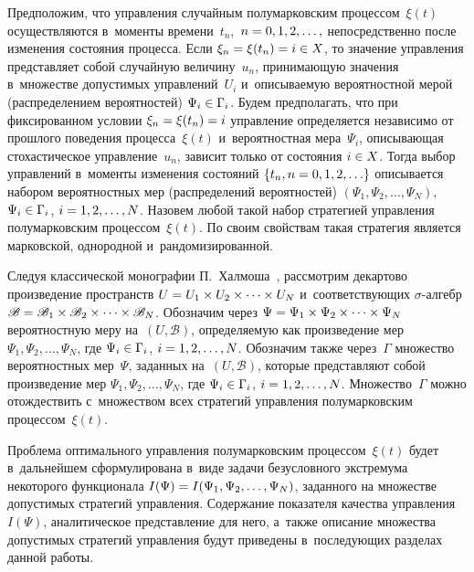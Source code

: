 \begin{multicols}{2}
Предположим, что управления случайным полумарковским процессом~$\xi(t)$ 
осуществляются в~моменты времени~$t_n,$ $n\hm=0,1,2,\ldots,$
непосредственно после изменения состояния процесса. Если\linebreak 
$\xi_n\hm=\xi(t_n)\hm=i \hm\in X$, то значение управления представляет 
собой случайную величину~$u_n$, принимающую значения в~множестве допустимых 
управ\-ле\-ний~$U_i$ и~описываемую вероятностной мерой (распределе\-ни\-ем 
вероятностей) $\Psi_i \hm\in \Gamma_i$.
Будем предполагать, что при фиксированном условии $\xi_n\hm=\xi(t_n)=i$ 
управ\-ле\-ние определяется независимо от прошлого поведения процесса~$\xi(t)$ 
и~вероятностная мера~$\Psi_i$,
описывающая стохастическое управление~$u_n$, зависит только от состояния $i\hm\in X$.
Тогда выбор управ\-ле\-ний в~моменты изменения состояний $\{t_n, n\hm=0,1,2,\ldots \}$ 
описывается набором вероятностных мер (распределений вероятностей) 
$(\Psi_1, \Psi_2,\ldots, \Psi_N)$, 
$\Psi_i \hm\in \Gamma_i$, $i\hm=1,2,\ldots,N$.
Назовем любой такой набор стратегией управ\-ле\-ния полумарковским процессом~$\xi(t)$. 
По своим свойствам такая стратегия является марковской, однородной 
и~рандомизированной.

Следуя классической монографии П.~Халмоша~\cite[гл.~VII]{18}, 
рассмотрим декартово произведение пространств $U\hm=U_1\times U_2\times \cdots\times U_N$ 
и~соответствующих $\sigma$-ал\-гебр $\mathscr{B}\hm=\mathscr{B}_1\times \mathscr{B}_2
\times \cdots \times\mathscr{B}_N$. Обозначим через $\Psi\hm=\Psi_1\times \Psi_2\times \cdots
\times \Psi_N$ вероятностную меру на~$(U,\mathscr{B})$, определяемую как 
произведение мер $\Psi_1,\Psi_2, \ldots , \Psi_N$, где $\Psi_i \hm\in \Gamma_i$, 
$i\hm=1,2,\ldots,N$. Обозначим также через~$\Gamma$ множество вероятностных мер~$\Psi$, 
заданных на~$(U,\mathscr{B})$, которые пред\-став\-ля\-ют собой произведение 
мер $\Psi_1,\Psi_2, \ldots , \Psi_N$, где $\Psi_i \hm\in \Gamma_i$, $i\hm=1,2,\ldots,N$.
Множество~$\Gamma$ можно отож\-де\-ст\-вить с~множеством всех стратегий управ\-ле\-ния 
полумарковским процессом~$\xi(t)$.

Проблема оптимального управления полумар\-ковским процессом~$\xi(t)$ будет в~дальнейшем 
сформулирована в~виде задачи безусловного экстремума некоторого функционала 
$I(\Psi)\hm=I(\Psi_1,\Psi_2, \ldots , \Psi_N)$, заданного на множестве 
допустимых стратегий управления. Содержание показателя качества управления~$I(\Psi)$, 
аналитическое представление для него, а~также описание множества допустимых 
стратегий управления будут приведены в~последующих разделах данной работы.


\end{multicols}
